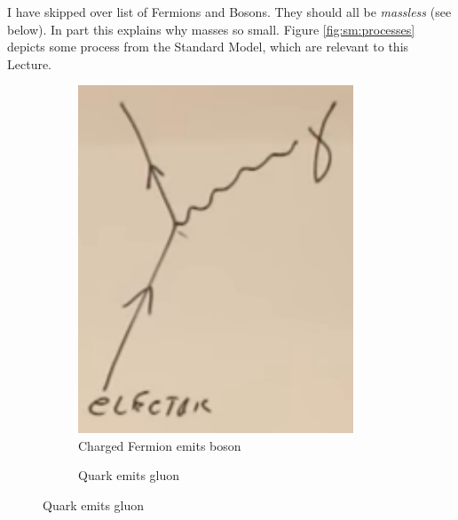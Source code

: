 \documentclass[]{article}
\begin{document}
\begin{appendices}
	I have skipped over list of Fermions and Bosons. They should all be \emph{massless} (see below). In part this explains why masses so small. Figure \ref{fig:sm:processes} depicts some process from the Standard Model, which are relevant to this Lecture.
	
	\begin{figure}[H]
		\caption{Processes of the Standard Model (not exhaustive)}\label{fig:sm:processes}
		\begin{subfigure}[t]{0.3\textwidth}
			\caption{Charged Fermion emits boson}
			\includegraphics[width=0.9\textwidth]{2-a2-feynman1}
		\end{subfigure}
		\begin{subfigure}[t]{0.3\textwidth}
			\caption{Quark emits gluon}

\end{subfigure}
\end{figure}
\end{appendices}
\end{document}
